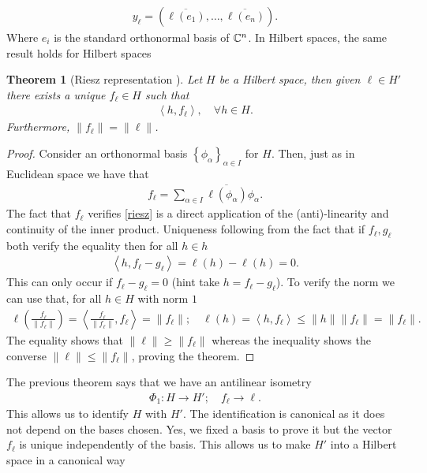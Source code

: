 \documentclass[12pt]{article}
\newtheorem{theorem}{Theorem}
\newcommand{\br}[1]{\left\langle#1\right\rangle} \newcommand{\set}[1]{\left\{#1\right\}}\newcommand{\qt}[1]{\left(#1\right)} \newcommand{\qp}[1]{\left(#1\right)}\newcommand{\qb}[1]{\left[#1\right]}
\renewcommand{\norm}[1]{\lVert #1 \rVert}\renewcommand{\abs}[1]{\left| #1 \right|}
\begin{document}
\begin{CJK*}{UTF8}{gbsn}
	\begin{align*}
		y_\ell =(\overline{\ell (e_1)},\ldots,\overline{\ell (e_n)}) .
	\end{align*}
	Where $e_i$ is the standard orthonormal basis of  $\mathbb{C}^n$. In Hilbert spaces, the same result holds for Hilbert spaces
	\begin{theorem}[Riesz representation ]\label{riesz theorem}
		Let $H$ be a Hilbert space, then given $\ell \in H'$ there exists a unique $f_\ell \in H$ such that
		\begin{align}\label{riesz}
			\br{h,f_\ell }, \quad\forall h \in H.
		\end{align}
		Furthermore, $\norm{f_\ell }=\norm{\ell }$.
	\end{theorem}
	\begin{proof}
		Consider an orthonormal basis $\set{\phi_\alpha}_{\alpha \in  I}$ for $H$. Then, just as in  Euclidean space we have that
		\begin{align*}
			f_\ell =\sum_{\alpha \in I}\overline{\ell (\phi_\alpha)}\phi_\alpha  .
		\end{align*}
		The fact that $f_\ell $ verifies \eqref{riesz} is a direct application of the (anti)-linearity and continuity of the inner product. Uniqueness following from the fact that if $f_\ell , g_\ell $ both verify the equality then for all $h \in h$
		\begin{align*}
			\br{h, f_\ell -g_\ell }= \ell (h)-\ell (h)=0.
		\end{align*}
		This can only occur if $f_\ell -g_\ell =0$ (hint take $h= f_\ell -g_\ell $). To verify the norm we can use that, for all $h \in  H$ with norm $1$
		\begin{align*}
			\ell   \qp{\frac{f_\ell }{\norm{f_\ell }} }= \br{\frac{f_\ell }{\norm{f_\ell }} ,f_\ell }=\norm{f_\ell }; \quad \ell(h)= \br{h, f_\ell }\leq \norm{h}\norm{f_\ell }= \norm{f_\ell }.
		\end{align*}
		The equality shows that $\norm{\ell }\geq \norm{f_\ell }$ whereas the inequality shows the converse $\norm{\ell }\leq \norm{f_\ell }$, proving the theorem.
	\end{proof}
	The previous theorem says that we have an antilinear isometry
	\begin{align*}
		\Phi_1:    H\to H';\quad f_\ell  \to \ell .
	\end{align*}
	This allows us to identify $H$ with  $H'$. The identification is canonical as it does not depend on the bases chosen. Yes, we fixed a basis to prove it but the vector $f_\ell $ is unique independently of the basis. This allows us to make $H'$ into a Hilbert space in a canonical way

\end{CJK*}
\end{document}
